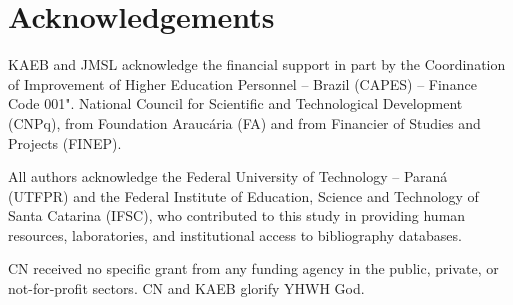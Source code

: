 \section*{Acknowledgements}

    KAEB and JMSL acknowledge the financial support in part by the Coordination  of  Improvement
    of Higher Education Personnel -- Brazil (CAPES) -- Finance Code 001". National  Council  for
    Scientific and Technological Development (CNPq), from Foundation  Araucária  (FA)  and  from
    Financier of Studies and Projects (FINEP).

    All authors acknowledge the Federal University of  Technology  --  Paraná  (UTFPR)  and  the
    Federal Institute of Education,  Science  and  Technology  of  Santa  Catarina  (IFSC),  who
    contributed to this study in providing  human  resources,  laboratories,  and  institutional
    access to bibliography databases.

    CN received  no  specific  grant  from  any  funding  agency  in  the  public,  private,  or
    not-for-profit sectors. CN and KAEB glorify YHWH God.


